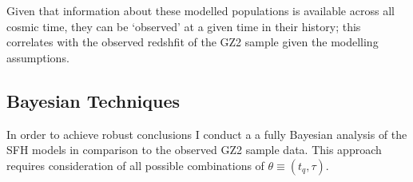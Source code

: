 \documentclass{mn2e}
\begin{document}
Given that information about these modelled populations is available across all cosmic time, they can be `observed' at a given time in their history; this correlates with the observed redshfit of the GZ2 sample given the modelling assumptions.

\subsection{Bayesian Techniques}
In order to achieve robust conclusions I conduct a a fully Bayesian analysis \citep{Sivia, MacKay} of the SFH models in comparison to the observed GZ2 sample data. This approach requires consideration of all possible combinations of $\theta \equiv (t_{q}, \tau)$. %
\end{document}
